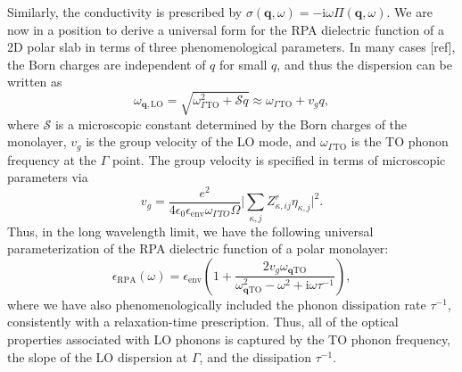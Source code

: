 \documentclass[aps,prb,twocolumn,
groupedaddress,superscriptaddress,
amsfonts,amssymb,amsmath,floatfix,
citeautoscript]{revtex4-1}
\newcommand{\iu}{\mathrm{i}}
\begin{document}
	Similarly, the conductivity is prescribed by $\sigma(\mathbf{q},\omega) = -\iu \omega \Pi(\mathbf{q},\omega)$. We are now in a position to derive a universal form for the RPA dielectric function of a 2D polar slab in terms of three phenomenological parameters. In many cases [ref], the Born charges are independent of $q$ for small $q$, and thus the dispersion can be written as
	\begin{equation}
	\omega_{\mathbf{q},\mathrm{LO}} = \sqrt{\omega^2_{\Gamma \mathrm{TO}}+\mathcal{S}q} \approx \omega_{\Gamma \mathrm{TO}} + v_g q,
	\end{equation}
	where $\mathcal{S}$ is a microscopic constant determined by the Born charges of the monolayer, $v_g$ is the group velocity of the LO mode, and $\omega_{\Gamma \mathrm{TO}}$ is the TO phonon frequency at the $\Gamma$ point. The group velocity is specified in terms of microscopic parameters via 
	\begin{equation}
	v_g = \frac{e^2 }{4\epsilon_0 \epsilon_{\mathrm{env}}\omega_{\Gamma TO}\Omega}\Big|\sum\limits_{\kappa,j}Z^r_{\kappa,ij}\eta_{\kappa,j}  \Big|^2. 
	\end{equation}
	Thus, in the long wavelength limit, we have the following universal parameterization of the RPA dielectric function of a polar monolayer:
	\begin{equation}
	\epsilon_{\mathrm{RPA}}(\omega) = \epsilon_{\mathrm{env}}\left( 1 + \frac{2v_g\omega_{\mathbf{q}\mathrm{TO}}}{\omega^2_{\mathbf{q}\mathrm{TO}}-\omega^2+\iu \omega \tau^{-1}}\right),
	\end{equation}
	where we have also phenomenologically included the phonon dissipation rate $\tau^{-1}$, consistently with  a relaxation-time prescription. Thus, all of the optical properties associated with LO phonons is captured by the TO phonon frequency, the slope of the LO dispersion at $\Gamma$, and the dissipation $\tau^{-1}$. %
	
\end{document}

